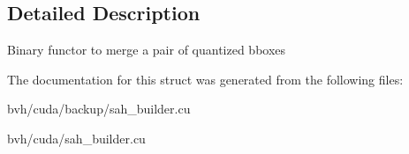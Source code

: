 \subsection{\-Detailed \-Description}
\-Binary functor to merge a pair of quantized bboxes 

\-The documentation for this struct was generated from the following files\-:\begin{DoxyCompactItemize}
\item 
bvh/cuda/backup/sah\-\_\-builder.\-cu\item 
bvh/cuda/sah\-\_\-builder.\-cu\end{DoxyCompactItemize}
